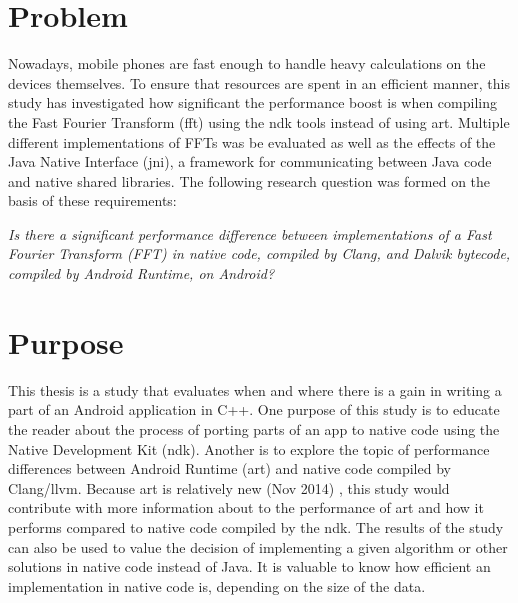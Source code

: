 \section{Problem}
Nowadays, mobile phones are fast enough to handle heavy calculations on the devices themselves. To ensure that resources are spent in an efficient manner, this study has investigated how significant the performance boost is when compiling the Fast Fourier Transform (\gls{fft}) using the \gls{ndk} tools instead of using \gls{art}. Multiple different implementations of FFTs was be evaluated as well as the effects of the Java Native Interface (\gls{jni}), a framework for communicating between Java code and native shared libraries. The following research question was formed on the basis of these requirements:


\begin{center}
    \textit{Is there a significant performance difference between implementations of a Fast Fourier Transform (FFT) in native code, compiled by Clang, and Dalvik bytecode, compiled by Android Runtime, on Android?}
\end{center}

\section{Purpose}
This thesis is a study that evaluates when and where there is a gain in writing a part of an Android application in C++. One purpose of this study is to educate the reader about the process of porting parts of an app to native code using the Native Development Kit (\gls{ndk}). Another is to explore the topic of performance differences between Android Runtime (\gls{art}) and native code compiled by Clang/\gls{llvm}. Because \gls{art} is relatively new (Nov 2014) \cite{android:dalvik:release}, this study would contribute with more information about to the performance of \gls{art} and how it performs compared to native code compiled by the \gls{ndk}. The results of the study can also be used to value the decision of implementing a given algorithm or other solutions in native code instead of Java. It is valuable to know how efficient an implementation in native code is, depending on the size of the data.


